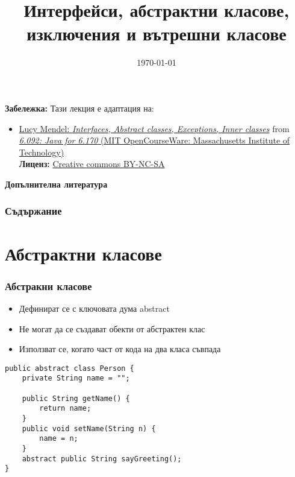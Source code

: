 \documentclass[ignorenonframetext, hyperref=unicode,compress,pdflatex]{beamer}
\title{Интерфейси, абстрактни класове, изключения и вътрешни класове}
\date{\today}
\begin{document}
\frame{\titlepage}


\begin{frame}
\small
{\bf Забележка:} Тази лекция е адаптация на:
\begin{itemize}
  \item \href{http://ocw.mit.edu/NR/rdonlyres/Electrical-Engineering-and-Computer-Science/6-092January--IAP--2006/13D676CC-7269-4406-A215-53245A12B235/0/lecture4.pdf}{Lucy Mendel: {\em Interfaces, Abstract classes, Exceptions, Inner classes}} from
\href{http://ocw.mit.edu/OcwWeb/Electrical-Engineering-and-Computer-Science/6-092January--IAP--2006/CourseHome/index.htm}{
{\em 6.092: Java for 6.170} (MIT OpenCourseWare:
Massachusetts Institute of Technology)}\\
{\bf Лиценз:}
\href{http://ocw.mit.edu/OcwWeb/web/terms/terms/index.htm\#cc}{Creative commons
BY-NC-SA}
\end{itemize}

\end{frame}

\begin{frame}

{\bf Допълнителна литература}
\nocite{*}



\end{frame}
\begin{frame}
\frametitle{Съдържание}
\tableofcontents %
\end{frame}


\section{Абстрактни класове}

\begin{frame}[containsverbatim]\frametitle{Абстракни класове}
\begin{itemize}
\item Дефинират се с ключовата дума abstract
\item Не могат да се създават обекти от абстрактен клас
\item Използват се, когато част от кода на два класа съвпада
\end{itemize}
\begin{lstlisting}
public abstract class Person {
 	private String name = "";

 	public String getName() {
 		return name;
	}
 	public void setName(String n) {
 		name = n;
	}
 	abstract public String sayGreeting();
}
\end{lstlisting}
\end{frame}
\end{document}
